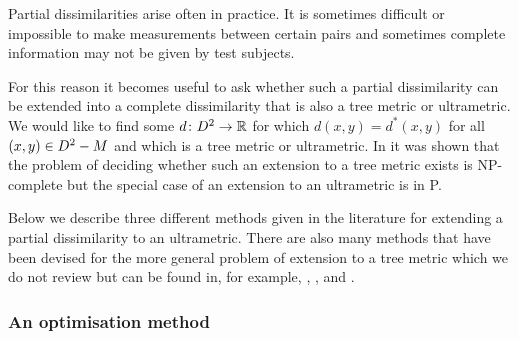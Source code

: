 Partial dissimilarities arise often in practice.  It is sometimes difficult or
impossible to make measurements between certain pairs and sometimes complete
information may not be given by test subjects.

For this reason it becomes useful to ask whether such a partial dissimilarity
can be extended into a complete dissimilarity that is also a tree metric or
ultrametric.  We would like to find some $d \colon D^2 \to {\mathbb R}$ for which
$d(x,y) = d^*(x,y)$ for all $(x,y) \in D^2 - M$ and which is a tree metric
or ultrametric.  In \citep{farach1995robust} it was shown that the problem of
deciding whether such an extension to a tree metric exists is NP-complete but
the special case of an extension to an ultrametric is in P.

Below we describe three different methods given in the literature for
extending a partial dissimilarity to an ultrametric.  There are also many
methods that have been devised for the more general problem of extension to a
tree metric which we do not review but can be found in, for example,
\citep{guenoche1999approximations}, \citep{farach1995robust},
\citep{makarenkov2001nouvelle} and \citep{guenoche2004extension}.

\subsubsection{An optimisation method}
\label{sec:part-dist-optim-method}

